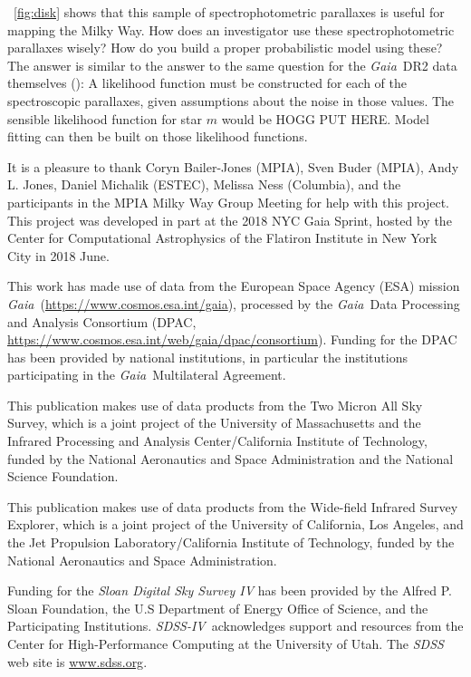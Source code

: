 \documentclass[modern]{aastex62}
\newcommand{\acronym}[1]{{\small{#1}}}
\newcommand{\project}[1]{\textsl{#1}}
\newcommand{\gaia}{\project{Gaia}}
\newcommand{\sdssiv}{\project{\acronym{SDSS-IV}}}
\begin{document}
\figurename~\ref{fig:disk} shows that this sample of spectrophotometric parallaxes is useful for
mapping the Milky Way.
How does an investigator use these spectrophotometric parallaxes wisely?
How do you build a proper probabilistic model using these?
The answer is similar to the answer to the same question for the \gaia\ \acronym{DR2} data
themselves (\citealt{gaialf}): A likelihood function must be constructed for each of the
spectroscopic parallaxes, given assumptions about the noise in those values.
The sensible likelihood function for star $m$ would be HOGG PUT HERE.
Model fitting can then be built on those likelihood functions.

\acknowledgements
It is a pleasure to thank
  Coryn Bailer-Jones (\acronym{MPIA}),
  Sven Buder (\acronym{MPIA}),
  Andy L. Jones,
  Daniel Michalik (\acronym{ESTEC}),
  Melissa Ness (Columbia),
  and the participants in the \acronym{MPIA} Milky Way Group Meeting
for help with this project.
This project was developed in part at the
2018 \acronym{NYC} Gaia Sprint, hosted by the Center for Computational Astrophysics of
the Flatiron Institute in New York City in 2018 June.

This work has made use of data from the European Space Agency (\acronym{ESA}) mission
\gaia\ (\url{https://www.cosmos.esa.int/gaia}), processed by the \gaia\ Data
Processing and Analysis Consortium (\acronym{DPAC},
\url{https://www.cosmos.esa.int/web/gaia/dpac/consortium}). Funding for the
\acronym{DPAC}
has been provided by national institutions, in particular the institutions
participating in the \gaia\ Multilateral Agreement.

This publication makes use of data products from the Two Micron All Sky Survey, which is a joint project of the University of Massachusetts and the Infrared Processing and Analysis Center/California Institute of Technology, funded by the National Aeronautics and Space Administration and the National Science Foundation.

This publication makes use of data products from the Wide-field Infrared Survey Explorer, which is a joint project of the University of California, Los Angeles, and the Jet Propulsion Laboratory/California Institute of Technology, funded by the National Aeronautics and Space Administration.

Funding for the \project{Sloan Digital Sky Survey IV} has been provided by the Alfred P. Sloan Foundation, the U.S Department of Energy Office of Science, and the Participating Institutions. \sdssiv\ acknowledges
support and resources from the Center for High-Performance Computing at
the University of Utah. The \project{\acronym{SDSS}} web site is \url{www.sdss.org}.
\end{document}
